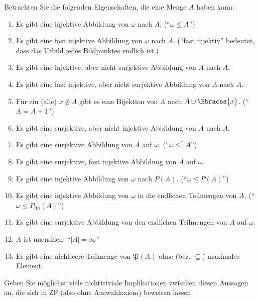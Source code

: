 
\begin{exercise}[272]

Betrachten Sie die folgenden Eigenschaften, die eine Menge $A$ haben kann:

\begin{enumerate}[label = \alph*.]
  \item Es gibt eine injektive Abbildung von $\omega$ nach $A$. (\enquote{$\omega \leq A$})
  \item Es gibt eine fast injektive Abbildung von $\omega$ nach $A$.
  (\enquote{fast injektiv} bedeutet, dass das Urbild jedes Bildpunktes endlich ist.)
  \item Es gibt eine injektive, aber nicht surjektive Abbildung von $A$ nach $A$.
  \item Es gibt eine fast injektive, aber nicht surjektive Abbildung von $A$ nach $A$.
  \item Für ein (alle) $x \notin A$ gibt es eine Bijektion von $A$ nach $A \cup \Bbraces{x}$.
  (\enquote{$A = A + 1$})
  \item Es gibt eine surjektive, aber nicht injektive Abbildung von $A$ nach $A$.
  \item Es gibt eine surjektive Abbildung von $A$ auf $\omega$. (\enquote{$\omega \leq^* A$})
  \item Es gibt eine surjektive, fast injektive Abbildung von $A$ auf $\omega$.
  \item Es gibt eine injektive Abbildung von $\omega$ nach $P(A)$. (\enquote{$\omega \leq P(A)$})
  \item Es gibt eine injektive Abbildung von $\omega$ in die endlichen Teilmengen von $A$. (\enquote{$\omega \leq P_\mathrm{fin}(A)$})
  \item Es gibt eine surjektive Abbildung von den endlichen Teilmengen von $A$ auf $\omega$.
  \item $A$ ist unendlich: \enquote{$|A| = \infty$}
  \item Es gibt eine nichtleere Teilmenge von $\mathfrak{P}(A)$ ohne (bez. $\subseteq$) maximales Element.
\end{enumerate}

Geben Sie möglichst viele nichttriviale Implikationen zwischen diesen Aussagen an, die sich in ZF (also ohne Auswahlaxiom) beweisen lassen.

\end{exercise}


